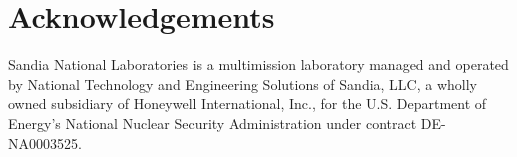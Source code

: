 \documentclass[aps,nofootinbib,pra,notitlepage,twocolumn]{revtex4-1}
\begin{document}
\section{Acknowledgements}
Sandia National Laboratories is a multimission laboratory managed and operated by National Technology and Engineering Solutions of Sandia, LLC, a wholly owned subsidiary of Honeywell International, Inc., for the U.S. Department of Energy's National Nuclear Security Administration under contract DE-NA0003525.

\end{document}
